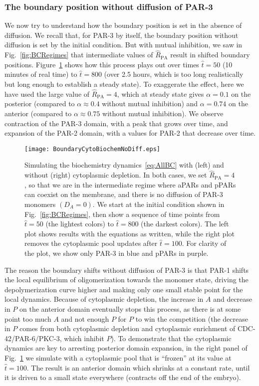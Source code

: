 \documentclass[11pt]{article}
\newcommand{\6}[1]{#1_{\text{6}}}
\newcommand{\3}[1]{#1_{\text{3}}}
\begin{document}
\subsubsection{The boundary position without diffusion of PAR-3}
We now try to understand how the boundary position is set in the absence of diffusion. We recall that, for PAR-3 by itself, the boundary position without diffusion is set by the initial condition. But with mutual inhibition, we saw in Fig.\ \ref{fig:BCRegimes} that intermediate values of $\hat R_\text{PA}$ result in shifted boundary positions. Figure\ \ref{fig:BoundaryNoDiff} shows how this process plays out over times $\hat t = 50$ (10 minutes of real time) to $\hat t = 800$ (over 2.5 hours, which is too long realistically but long enough to establish a steady state). To exaggerate the effect, here we have used the large value of $\hat R_\text{PA}=4$, which at steady state gives $\alpha=0.1$ on the posterior (compared to $\alpha \approx 0.4$ without mutual inhibition) and $\alpha=0.74$ on the anterior (compared to $\alpha \approx 0.75$ without mutual inhibition). We observe contraction of the PAR-3 domain, with a peak that grows over time, and expansion of the PAR-2 domain, with a values for PAR-2 that decrease over time. 

\begin{figure}
\centering
\texttt{[image: BoundaryCytoBiochemNoDiff.eps]}
\caption{\label{fig:BoundaryNoDiff}Simulating the biochemistry dynamics\ \eqref{eq:AllBC} with (left) and without (right) cytoplasmic depletion. In both cases, we set $\hat R_\text{PA}=4$, so that we are in the intermediate regime where aPARs and pPARs can coexist on the membrane, and there is no diffusion of PAR-3 monomers $\left(D_A=0\right)$. We start at the initial condition shown in Fig.\ \ref{fig:BCRegimes}, then show a sequence of time points from $\hat t = 50$ (the lightest colors) to $\hat t = 800$ (the darkest colors). The left plot shows results with the equations as written, while the right plot removes the cytoplasmic pool updates after $\hat t = 100$. For clarity of the plot, we show only PAR-3 in blue and pPARs in purple.}
\end{figure}

The reason the boundary shifts without diffusion of PAR-3 is that PAR-1 shifts the local equilibrium of oligomerization towards the monomer state, driving the depolymerization curve higher and making only one small stable point for the local dynamics. Because of cytoplasmic depletion, the increase in $A$ and decrease in $P$ on the anterior domain eventually stops this process, as there is at some point too much $A$ and not enough $P$ for $P$ to win the competition (the decrease in $P$ comes from both cytoplasmic depletion and cytoplasmic enrichment of CDC-42/PAR-6/PKC-3, which inhibit $P$). To demonstrate that the cytoplasmic dynamics are key to arresting posterior domain expansion, in the right panel of Fig.\ \ref{fig:BoundaryNoDiff} we simulate with a cytoplasmic pool that is ``frozen'' at its value at $\hat t = 100$. The result is an anterior domain which shrinks at a constant rate, until it is driven to a small state everywhere (contracts off the end of the embryo). 
\end{document}
